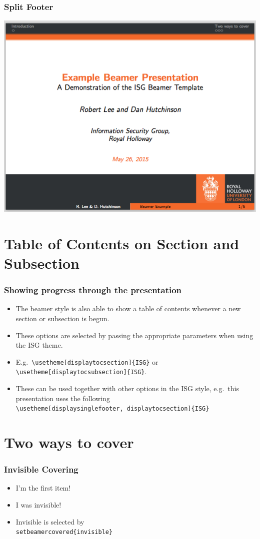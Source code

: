 \documentclass{beamer}
\begin{document}
\begin{frame}\frametitle{Split Footer}
\begin{center}
	\includegraphics[scale=0.4]{graphics/split-footer.png}
\end{center}
\end{frame}

\section{Table of Contents on Section and Subsection}
\begin{frame}\frametitle{Showing progress through the presentation}
\begin{itemize}
\item The beamer style is also able to show a table of contents whenever a new section or subsection is begun.
\item These options are selected by passing the appropriate parameters when using the ISG theme.
\item E.g.\ \texttt{\textbackslash usetheme[displaytocsection]\{ISG\}} or \texttt{\textbackslash usetheme[displaytocsubsection]\{ISG\}}.
\item These can be used together with other options in the ISG style, e.g.\ this presentation uses the following\\ {\scriptsize\texttt{\textbackslash usetheme[displaysinglefooter, displaytocsection]\{ISG\}}}
\end{itemize}
\end{frame}

\section{Two ways to cover}
\begin{frame}\frametitle{Invisible Covering}
\begin{itemize}
\item{I'm the first item!}
\pause
\item{I was invisible!}
\pause
\item Invisible is selected by \texttt{\\setbeamercovered\{invisible\}}
\end{itemize}
\end{frame}
\end{document}
